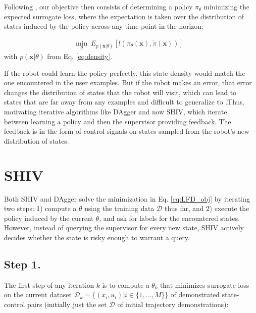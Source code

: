 \documentclass[10pt, conference]{ieeeconf}      %
\newcommand{\bx}{\mathbf{x}}
\begin{document}
Following \cite{ross2010reduction}, our objective then consists of determining a policy $\pi_{\theta}$ minimizing the expected surrogate loss, where the expectation is taken over the distribution of states induced by the policy across any time point in the horizon:

 \vspace{-2ex}
\begin{align}\label{eq:LFD_obj}
\underset{\theta}{\min} \: E_{p(\bx|\theta)} [l(\pi_\theta(\bx),\tilde{\pi}(\bx))]
\end{align}
with $p(\bx|\theta)$ from Eq. \ref{eq:density}.

 If the robot could learn the policy  perfectly, this state density would match the one encountered in the user examples. But if the robot makes an error, that error changes the distribution of states that the robot will visit, which can lead to states that are far away from any examples and difficult to generalize to \cite{pomerleau1989alvinn}.Thus, motivating iterative algorithms like DAgger and now SHIV, which iterate between learning a policy and then the supervisor providing feedback. The feedback is in the form of control signals on states sampled from the robot's new distribution of states. 


\section{SHIV} \label{sec:SHIV}

Both SHIV and DAgger \cite{ross2010reduction} solve the minimization in Eq. \ref{eq:LFD_obj} by iterating two steps: 1) compute a $\theta$ using the training data $\mathcal{D}$ thus far, and 2) execute the policy induced by the current $\theta$, and ask for labels for the encountered states. However, instead of querying the supervisor for every new state, SHIV actively decides whether the state is risky enough to warrant a query. 


\subsection{Step 1.}
The first step of any iteration $k$ is to compute a $\theta_k$ that minimizes surrogate loss on the current dataset $\mathcal{D}_k=\{(x_i,u_i)|i\in\{1,\ldots,M\}\}$ of demonstrated state-control pairs (initially just the set $\mathcal{D}$ of initial trajectory demonstrations):
\end{document}
